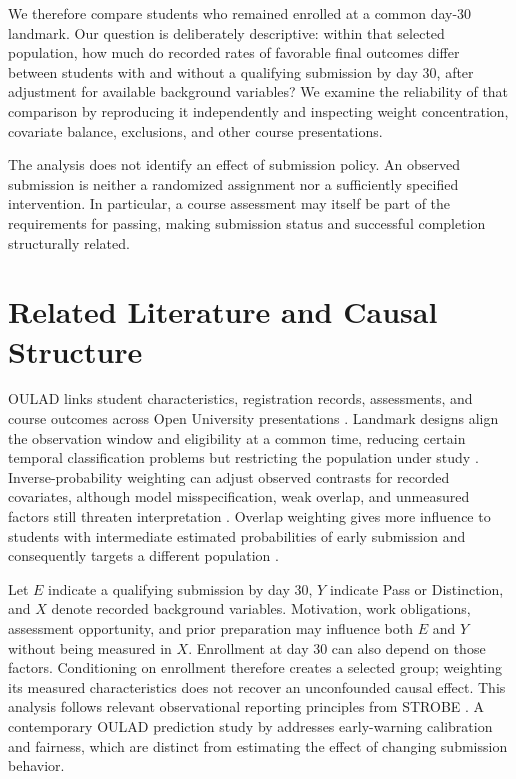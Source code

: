 \documentclass[10pt,a4paper]{article}
\begin{document}
We therefore compare students who remained enrolled at a common day-30 landmark. Our question is deliberately descriptive: within that selected population, how much do recorded rates of favorable final outcomes differ between students with and without a qualifying submission by day 30, after adjustment for available background variables? We examine the reliability of that comparison by reproducing it independently and inspecting weight concentration, covariate balance, exclusions, and other course presentations.

The analysis does not identify an effect of submission policy. An observed submission is neither a randomized assignment nor a sufficiently specified intervention. In particular, a course assessment may itself be part of the requirements for passing, making submission status and successful completion structurally related.

\section{Related Literature and Causal Structure}
OULAD links student characteristics, registration records, assessments, and course outcomes across Open University presentations \citep{kuzilek2017}. Landmark designs align the observation window and eligibility at a common time, reducing certain temporal classification problems but restricting the population under study \citep{hernan2016}. Inverse-probability weighting can adjust observed contrasts for recorded covariates, although model misspecification, weak overlap, and unmeasured factors still threaten interpretation \citep{austin2015}. Overlap weighting gives more influence to students with intermediate estimated probabilities of early submission and consequently targets a different population \citep{li2018}.

Let $E$ indicate a qualifying submission by day 30, $Y$ indicate Pass or Distinction, and $X$ denote recorded background variables. Motivation, work obligations, assessment opportunity, and prior preparation may influence both $E$ and $Y$ without being measured in $X$. Enrollment at day 30 can also depend on those factors. Conditioning on enrollment therefore creates a selected group; weighting its measured characteristics does not recover an unconfounded causal effect. This analysis follows relevant observational reporting principles from STROBE \citep{strobe2007}. A contemporary OULAD prediction study by \citet{wu2026} addresses early-warning calibration and fairness, which are distinct from estimating the effect of changing submission behavior.
\end{document}
